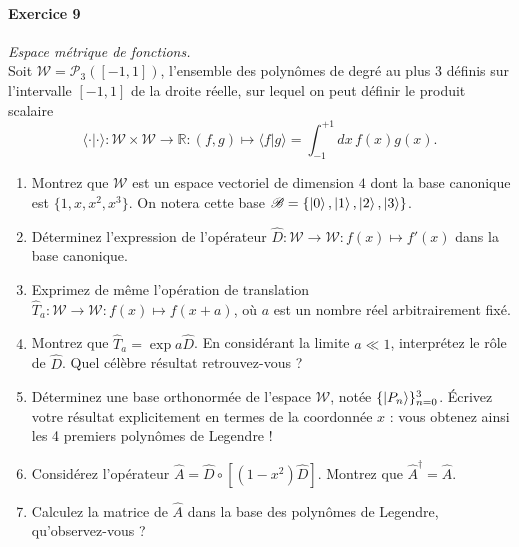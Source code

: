 \paragraph{Exercice 9} \textit{Espace métrique de fonctions.} \\
Soit $\mathcal W = \mathcal P_3([-1,1])$, l'ensemble des polynômes de degré au plus 3 définis sur l'intervalle $[-1,1]$ de la droite réelle, sur lequel on peut définir le produit scalaire
\begin{equation}
\langle \cdot|\cdot\rangle : \mathcal W \times \mathcal W\to\mathbb R : (f,g) \mapsto \langle f|g\rangle = \int_{-1}^{+1} dx\, f(x)g(x).
\end{equation}
\begin{enumerate}
\item Montrez que $\mathcal W$ est un espace vectoriel de dimension $4$ dont la base canonique est $\lbrace 1,x,x^2,x^3 \rbrace$. On notera cette base $\mathscr B = \lbrace \ket 0,\ket 1,\ket 2,\ket 3\rbrace$. 
\item Déterminez l'expression de l'opérateur $\hat D : \mathcal W\to \mathcal W : f(x) \mapsto f'(x)$ dans la base canonique.
\item Exprimez de même l'opération de translation $\hat T_a : \mathcal W \to \mathcal W : f(x) \mapsto f(x+a)$, où $a$ est un nombre réel arbitrairement fixé.
\item Montrez que $\hat T_a = \exp a \hat D$. En considérant la limite $a\ll 1$, interprétez le rôle de $\hat D$. Quel célèbre résultat retrouvez-vous ?
\item Déterminez une base orthonormée de l'espace $\mathcal W$, notée $\lbrace \ket{P_n}\rbrace_{n=0}^3$. Écrivez votre résultat explicitement en termes de la coordonnée $x$ : vous obtenez ainsi les 4 premiers polynômes de Legendre !
\item Considérez l'opérateur $\hat A = \hat D \circ [(1-x^2)\hat D]$. Montrez que $\hat A^\dagger = \hat A$.
\item Calculez la matrice de $\hat A$ dans la base des polynômes de Legendre, qu'observez-vous ?
\end{enumerate}